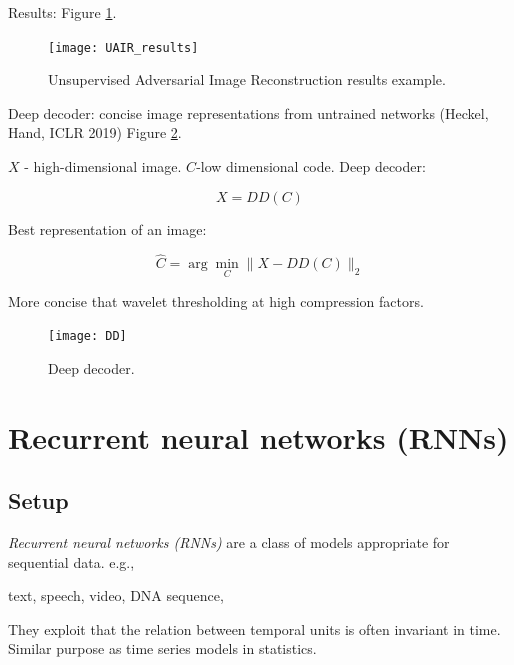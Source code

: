 \documentclass[english]{article}
\begin{document}
Results: Figure \ref{UAIRr}.

\begin{figure}
  \centering
  \texttt{[image: UAIR\_results]}
  \caption{Unsupervised Adversarial Image Reconstruction results example.}
  \label{UAIRr}
\end{figure}

\item Deep decoder: concise image representations from untrained networks (Heckel, Hand, ICLR 2019) Figure \ref{DD}.

$X$ - high-dimensional image. $C$-low dimensional code. Deep decoder: 

$$X = DD(C)$$

Best representation of an image: 

$$\hat C = \arg\min_C\|X-DD(C)\|_2$$

More concise that wavelet thresholding at high compression factors. 


\begin{figure}
  \centering
  \texttt{[image: DD]}
  \caption{Deep decoder.}
  \label{DD}
\end{figure}

\eenum 








\section{Recurrent neural networks (RNNs)}
\subsection{Setup}
\benum
\item \emph{Recurrent neural networks (RNNs)} are a class of models appropriate for sequential data. e.g., 

text, speech, video, DNA sequence, 

They exploit that the relation between temporal units is often invariant in time. Similar purpose as time series models in statistics. 
\end{document}
